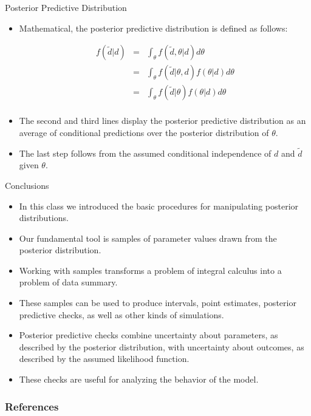 \documentclass[handout]{beamer}
\begin{document}
\begin{frame}{Posterior Predictive Distribution}
\scriptsize{


\begin{itemize}
 
\item Mathematical, the posterior predictive distribution is defined as follows:

  \begin{eqnarray*}
 f(\tilde{d}|d) & = & \int_{\theta}f(\tilde{d},\theta|d)d\theta \\ 
                & = &  \int_{\theta}f(\tilde{d}|\theta,d)f(\theta|d)d\theta \\
                & = &  \int_{\theta}f(\tilde{d}|\theta)f(\theta|d)d\theta \\
 \end{eqnarray*}
 
 \item The second and third lines display the posterior predictive distribution as an average of conditional predictions over the posterior distribution of $\theta$.
 
 \item The last step follows from the assumed conditional independence of $d$ and $\tilde{d}$ given $\theta$.
 
 
 
\end{itemize}










} 
\end{frame}







\begin{frame}{Conclusions}
\scriptsize{

\begin{itemize}
\item In this class we introduced the basic procedures for manipulating posterior distributions.
\item Our fundamental tool is samples of parameter values drawn from the posterior distribution.
\item Working with samples transforms a problem of integral calculus into a problem of data summary. 
\item These samples can be used to produce intervals, point estimates, posterior predictive checks, as well as other kinds of simulations.
\item Posterior predictive checks combine uncertainty about parameters, as described by the posterior distribution, with uncertainty about outcomes, as described by the assumed likelihood function. 
\item These checks are useful for analyzing the behavior of the model.
\end{itemize}


} 
\end{frame}


\begin{frame}[allowframebreaks]\scriptsize
\frametitle{References}


%
\end{frame}  









\end{document}
